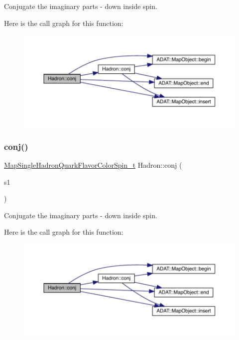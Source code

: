 Conjugate the imaginary parts -\/ down inside spin. 

Here is the call graph for this function\+:
\nopagebreak
\begin{figure}[H]
\begin{center}
\leavevmode
\includegraphics[width=350pt]{d1/daf/namespaceHadron_a218b77b239d871def6267d4b34bdf7c1_cgraph}
\end{center}
\end{figure}
\mbox{\label{namespaceHadron_a225bbef2231c488eb28201396913bae0}} 
\subsubsection{\texorpdfstring{conj()}{conj()}\hspace{0.1cm}{\footnotesize\ttfamily [3/3]}}
{\footnotesize\ttfamily \mbox{\hyperlink{namespaceHadron_a03b319764f85c20434f20a269ce5f388}{Map\+Single\+Hadron\+Quark\+Flavor\+Color\+Spin\+\_\+t}} Hadron\+::conj (\begin{DoxyParamCaption}\item[{const \mbox{\hyperlink{namespaceHadron_a03b319764f85c20434f20a269ce5f388}{Map\+Single\+Hadron\+Quark\+Flavor\+Color\+Spin\+\_\+t}} \&}]{s1 }\end{DoxyParamCaption})}



Conjugate the imaginary parts -\/ down inside spin. 

Here is the call graph for this function\+:
\nopagebreak
\begin{figure}[H]
\begin{center}
\leavevmode
\includegraphics[width=350pt]{d1/daf/namespaceHadron_a225bbef2231c488eb28201396913bae0_cgraph}
\end{center}
\end{figure}
\mbox{\label{namespaceHadron_af2328410f9a0a7191a4d319284425fed}} 
